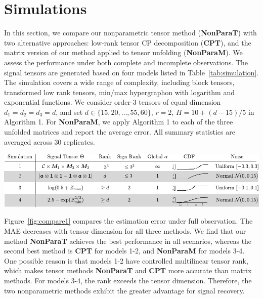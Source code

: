 \documentclass[useAMS,usenatbib,usegraphicx,referee]{biom}
\theoremstyle{plain}
\theoremstyle{definition}
\begin{document}
\section{Simulations}\label{sec:simulation}
In this section, we compare our nonparametric tensor method ({\bf NonParaT}) with two alternative approaches: low-rank tensor CP decomposition ({\bf CPT}), and the matrix version of our method applied to tensor unfolding ({\bf NonParaM}). We assess the performance under both complete and incomplete observations. The signal tensors are generated based on four models listed in Table~\ref{tab:simulation}. The simulation covers a wide range of complexity, including block tensors, transformed low rank tensors, min/max hypergraphon with logarithm and exponential functions. We consider order-3  tensors of equal dimension $d_1=d_2=d_3=d$, and set $d\in \{15, 20,\ldots,55,60\}$, $r=2$, $H=10+{(d-15)/ 5}$ in Algorithm 1. For {\bf NonParaM}, we apply Algorithm 1 to each of the three unfolded matrices and report the average error. All summary statistics are averaged across $30$ replicates.  

\begin{table}[h]
\includegraphics[width=1\textwidth]{figure/simulation.pdf}
 \captionsetup{justification=raggedright,font=small}
\caption{Simulation models used for comparison. We use $\mM_k\in\{0,1\}^{d\times 3}$ to denote membership matrices, $\tC\in\mathbb{R}^{3\times 3\times 3}$ the block means, $\ma={1\over d}(1,2,\ldots,d)^T \in\mathbb{R}^d$, $\tZ_{\max}$ and $\tZ_{\min}$ are order-3 tensors with entries ${1\over d}\max(i,j,k)/d$ and ${1\over d}\min(i,j,k)$, respectively.}\label{tab:simulation}
\end{table}
\vspace{-.5cm}

Figure~\ref{fig:compare1} compares the estimation error under full observation. The MAE decreases with tensor dimension for all three methods. We find that our method {\bf NonParaT} achieves the best performance in all scenarios, whereas the second best method is {\bf CPT} for models 1-2, and {\bf NonParaM} for models 3-4. One possible reason is that models 1-2 have controlled multilinear tensor rank, which makes tensor methods {\bf NonParaT} and {\bf CPT} more accurate than matrix methods. For models 3-4, the rank exceeds the tensor dimension. Therefore, the two nonparametric methods  exhibit the greater advantage for signal recovery. 
\end{document}
